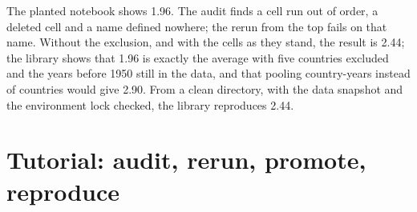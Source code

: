 \begin{omfigure}

\label{fig:pl:the-research-environment:repro}
\end{omfigure}

\begin{example}\label{ex:pl:the-research-environment:rerun}
The planted notebook shows 1.96. The audit finds a cell run out of order, a deleted cell and a name defined nowhere; the rerun from the top
fails on that name. Without the exclusion, and with the cells as they stand, the result is 2.44; the library shows that 1.96 is exactly the
average with five countries excluded and the years before 1950 still in the data, and that pooling country-years instead of countries would
give 2.90. From a clean directory, with the data snapshot and the environment lock checked, the library reproduces 2.44.
\end{example}

\section{Tutorial: audit, rerun, promote, reproduce}\label{tut:pl:the-research-environment:tut}


